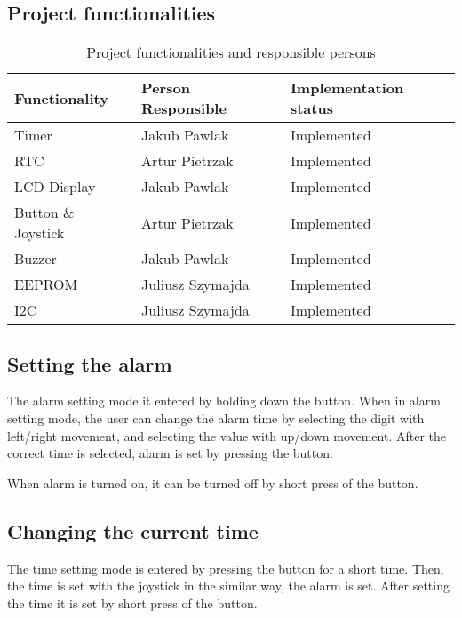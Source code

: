 \documentclass[10pt]{article}
\begin{document}
\subsection{Project functionalities}
\begin{table}[H]\centering
	\begin{tabular}{|l|l|l|}
		\hline
		\bf Functionality  & \bf Person Responsible & \bf Implementation status \\ \hline
		Timer              & Jakub Pawlak           & Implemented               \\ \hline
		RTC                & Artur Pietrzak         & Implemented               \\ \hline
		LCD Display        & Jakub Pawlak           & Implemented               \\ \hline
		Button \& Joystick & Artur Pietrzak         & Implemented               \\ \hline
		Buzzer             & Jakub Pawlak           & Implemented               \\ \hline
		EEPROM             & Juliusz Szymajda       & Implemented               \\ \hline
		I2C                & Juliusz Szymajda       & Implemented               \\ \hline
	\end{tabular}
	\caption{Project functionalities and responsible persons}
\end{table}

\subsection{Setting the alarm}
The alarm setting mode it entered by holding down the button.
When in alarm setting mode, the user can change the alarm time by selecting the digit with left/right movement, and selecting the value with up/down movement.
After the correct time is selected, alarm is set by pressing the button.

When alarm is turned on, it can be turned off by short press of the button.

\subsection{Changing the current time}
The time setting mode is entered by pressing the button for a short time.
Then, the time is set with the joystick in the similar way, the alarm is set.
After setting the time it is set by short press of the button.
\end{document}
